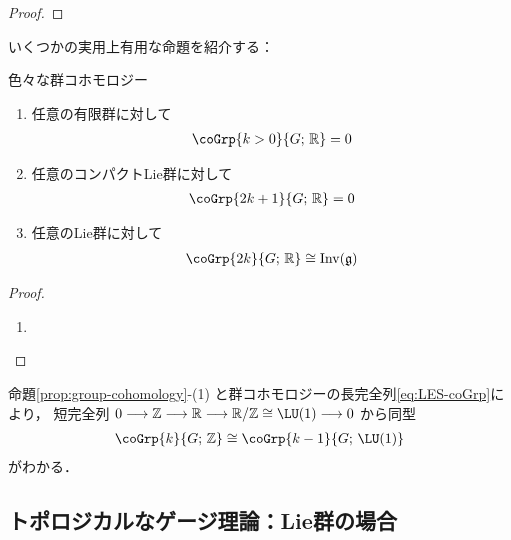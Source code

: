 \documentclass[TQFT_main]{subfiles}
\begin{document}
\begin{proof}
    
\end{proof}

いくつかの実用上有用な命題を紹介する：
\begin{myprop}[label=prop:group-cohomology]{色々な群コホモロジー}
    \begin{enumerate}
        \item 任意の有限群に対して
        \begin{align}
            \coGrp{k > 0}{G;\, \mathbb{R}} = 0
        \end{align}
        \item 任意のコンパクトLie群に対して
        \begin{align}
            \coGrp{2k+1}{G;\, \mathbb{R}} = 0
        \end{align}
        \item 任意のLie群に対して
        \begin{align}
            \coGrp{2k}{G;\, \mathbb{R}} \cong \mathrm{Inv}(\mathfrak{g})
        \end{align}
    \end{enumerate}
\end{myprop}

\begin{proof}
    \begin{enumerate}
        \item 
    \end{enumerate}
\end{proof}
命題\ref{prop:group-cohomology}-(1) と群コホモロジーの長完全列\eqref{eq:LES-coGrp}により，
短完全列 $0 \lto \mathbb{Z} \lto \mathbb{R} \lto \mathbb{R}/\mathbb{Z} \cong \LU (1) \lto 0$ から同型
\begin{align}
    \coGrp{k}{G;\, \mathbb{Z}} \cong \coGrp{k-1}{G;\, \LU(1)}
\end{align}
がわかる．

\subsection{トポロジカルなゲージ理論：Lie群の場合}
\end{document}
